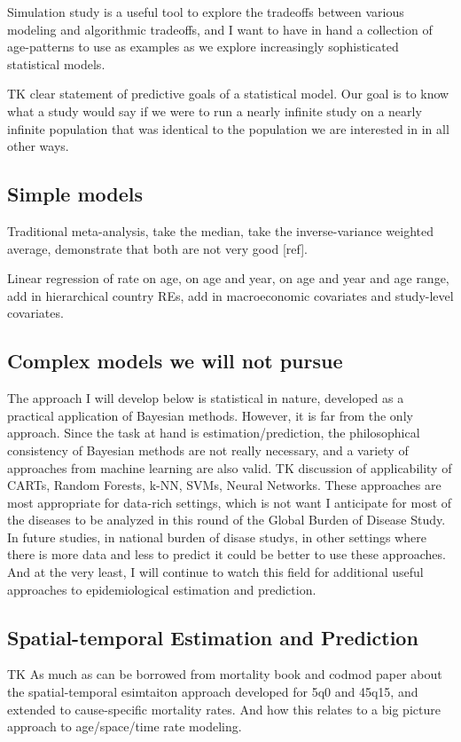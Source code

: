 Simulation study is a useful tool to explore the tradeoffs between
various modeling and algorithmic tradeoffs, and I want to have in hand
a collection of age-patterns to use as examples as we explore
increasingly sophisticated statistical models.

TK clear statement of predictive goals of a statistical model. Our
goal is to know what a study would say if we were to run a nearly
infinite study on a nearly infinite population that was identical to
the population we are interested in in all other ways.


\subsection{Simple models}

Traditional meta-analysis, take the median, take the inverse-variance
weighted average, demonstrate that both are not very good [ref].

Linear regression of rate on age, on age and year, on age and year and
age range, add in hierarchical country REs, add in macroeconomic
covariates and study-level covariates.


\subsection{Complex models we will not pursue}
The approach I will develop below is statistical in nature, developed
as a practical application of Bayesian methods. However, it is far
from the only approach. Since the task at hand is
estimation/prediction, the philosophical consistency of Bayesian
methods are not really necessary, and a variety of approaches from
machine learning are also valid. TK discussion of applicability of
CARTs, Random Forests, k-NN, SVMs, Neural Networks. These approaches
are most appropriate for data-rich settings, which is not want I
anticipate for most of the diseases to be analyzed in this round of
the Global Burden of Disease Study. In future studies, in national
burden of disase studys, in other settings where there is more data
and less to predict it could be better to use these approaches. And at
the very least, I will continue to watch this field for additional
useful approaches to epidemiological estimation and prediction.

\subsection{Spatial-temporal Estimation and Prediction}
TK As much as can be borrowed from mortality book and codmod paper
about the spatial-temporal esimtaiton approach developed for 5q0 and
45q15, and extended to cause-specific mortality rates. And how this
relates to a big picture approach to age/space/time rate modeling.


